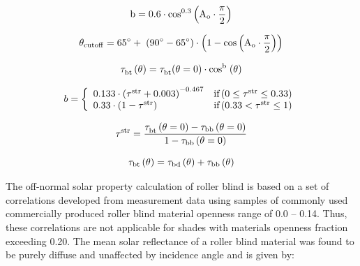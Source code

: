 {\begin{equation}
{\rm{b}} = {\rm{0}}{\rm{.6}} \cdot {\rm{co}}{{\rm{s}}^{{\rm{0}}{\rm{.3}}}}\left( {{{\rm{A}}_{\rm{o}}} \cdot \frac{{\rm{\pi }}}{{\rm{2}}}} \right)
\end{equation}

\begin{equation}
{{\rm{\theta }}_{{\rm{cutoff}}}} = {\rm{65}}^\circ  + \;\left( {{\rm{90}}^\circ  - {\rm{65}}^\circ } \right) \cdot \left( {{\rm{1}} - {\rm{cos}}\left( {{{\rm{A}}_{\rm{o}}} \cdot \frac{{\rm{\pi }}}{{\rm{2}}}} \right)} \right)
\end{equation}

\begin{equation}
{\rm{\tau }}_{{\rm{bt}}}^{}\left( {\rm{\theta }} \right) = {\rm{\tau }}_{{\rm{bt}}}^{}{\rm{(\theta }} = {\rm{0)}} \cdot {\rm{co}}{{\rm{s}}^{\rm{b}}}{\kern 1pt} \left( {\rm{\theta }} \right)
\end{equation}

\begin{equation}
b = \left\{ 
    \begin{array}{lc}
      0.133 \cdot \left( \rm{\tau}^{str} + 0.003 \right)^{-0.467} &\text{if} \left( 0 \le \rm{\tau}^{str} \le 0.33 \right) \\
      0.33 \cdot \left( 1 - \rm{\tau}^{str} \right)               &\text{if} \left( 0.33 < \rm{\tau}^{str} \le 1 \right)
    \end{array}
  \right.
\end{equation}

\begin{equation}
{\rm{\tau }}_{}^{{\rm{str}}} = \frac{{{\rm{\tau }}_{{\rm{bt}}}^{}\left( {{\rm{\theta }} = {\rm{0}}} \right) - {{\rm{\tau }}_{{\rm{bb}}}}\left( {{\rm{\theta }} = {\rm{0}}} \right)}}{{{\rm{1}} - {{\rm{\tau }}_{{\rm{bb}}}}\left( {{\rm{\theta }} = {\rm{0}}} \right)}}
\end{equation}

\begin{equation}
{\rm{\tau_{bt}}}\left( {\rm{\theta }} \right) = {\rm{\tau_{bd}}}\left( {\rm{\theta }} \right) + {\rm{\tau_{bb}}}\left( {\rm{\theta }} \right)
\end{equation}

The off-normal solar property calculation of roller blind is based on a set of correlations developed from measurement data using samples of commonly used commercially produced roller blind material openness range of 0.0 -- 0.14. Thus, these correlations are not applicable for shades with materials openness fraction exceeding 0.20. The mean solar reflectance of a roller blind material was found to be purely diffuse and unaffected by incidence angle and is given by:

}
